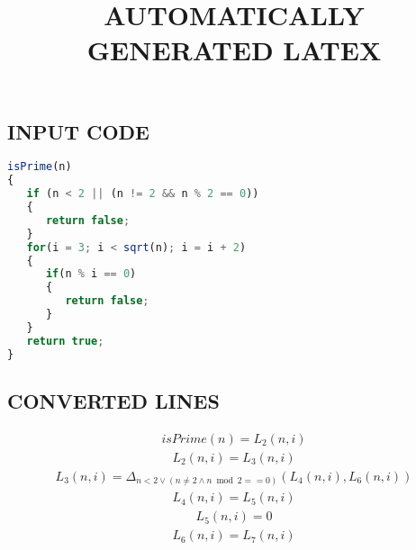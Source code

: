\documentclass{article}
\begin{document}
\title{AUTOMATICALLY GENERATED LATEX}
\maketitle

\subsection{INPUT CODE}
\begin{lstlisting}[language=JavaScript]
isPrime(n)
{
   if (n < 2 || (n != 2 && n % 2 == 0))
   {
      return false;
   }
   for(i = 3; i < sqrt(n); i = i + 2)
   {
      if(n % i == 0)
      {
         return false;
      }
   }
   return true;
}

\end{lstlisting}

\subsection{CONVERTED LINES}
\begin{equation*}\begin{split}
isPrime \left(n \right) = L_{2} \left(n,i \right)
\end{split}\end{equation*}
\begin{equation*}\begin{split}
L_{2} \left(n,i \right) = L_{3} \left(n,i \right)
\end{split}\end{equation*}
\begin{equation*}\begin{split}
L_{3} \left(n,i \right) = \Delta_{n < 2  \lor   \left(n  \ne  2  \land  n  \bmod{} 2 == 0 \right)} \left(L_{4} \left(n,i \right),L_{6} \left(n,i \right) \right)
\end{split}\end{equation*}
\begin{equation*}\begin{split}
L_{4} \left(n,i \right) = L_{5} \left(n,i \right)
\end{split}\end{equation*}
\begin{equation*}\begin{split}
L_{5} \left(n,i \right) = 0
\end{split}\end{equation*}
\begin{equation*}\begin{split}
L_{6} \left(n,i \right) = L_{7} \left(n,i \right)
\end{split}\end{equation*}
\end{document}
